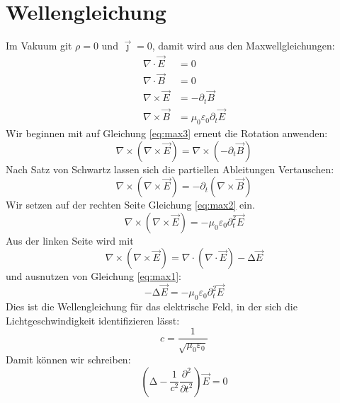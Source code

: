 \documentclass{scrartcl}
\begin{document}
\section{Wellengleichung}
Im Vakuum git $\rho=0$ und $\vec{\jmath}=0$, 
damit wird aus den Maxwellgleichungen:
\begin{align}
  \nabla \cdot  \vec{E} &= 0 \label{eq:max1} \\
  \nabla \cdot  \vec{B} &= 0 \label{eq:max2} \\
  \nabla \times \vec{E} &= - \partial_t \vec{B}  \label{eq:max3} \\
  \nabla \times \vec{B} &= \mu_0 \varepsilon_0 \partial_t \vec{E}\label{eq:max4}
\end{align}
Wir beginnen mit auf Gleichung \eqref{eq:max3} erneut die Rotation anwenden:
\begin{equation}
  \nabla \times \left( \nabla \times \vec{E}\right) = \nabla \times \left(- \partial_t \vec{B} \right)
\end{equation}
Nach Satz von Schwartz lassen sich die partiellen Ableitungen Vertauschen:
\begin{equation}
  \nabla \times \left( \nabla \times \vec{E}\right) = - \partial_t \left( \nabla \times  \vec{B} \right)
\end{equation}
Wir setzen auf der rechten Seite Gleichung \eqref{eq:max2} ein.
\begin{equation}
  \nabla \times \left( \nabla \times \vec{E}\right) = -\mu_0 \varepsilon_0 \partial_t^2 \vec{E}
\end{equation}
Aus der linken Seite wird mit
\begin{equation}
  \nabla \times \left(\nabla \times \vec{E}\right) = \nabla \cdot \left(\nabla\cdot \vec{E}\right) - \mathup{\Delta} \vec{E}
\end{equation}
und ausnutzen von Gleichung \eqref{eq:max1}:
\begin{equation}
  - \mathup{\Delta}\vec{E} = -\mu_0 \varepsilon_0 \partial_t^2 \vec{E}
\end{equation}
Dies ist die Wellengleichung für das elektrische Feld, in der sich die Lichtgeschwindigkeit identifizieren lässt:
\begin{equation}
  c = \frac{1}{\sqrt{\mu_0 \varepsilon_0}}
\end{equation}
Damit können wir schreiben:
\begin{equation}
  \left(\mathup{\Delta} - \frac{1}{c^2} \frac{\partial^2}{\partial t^2} \right) \vec{E} = 0
\end{equation}
\end{document}
